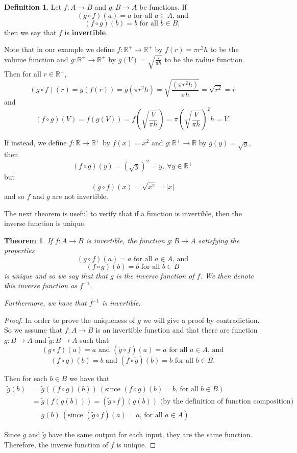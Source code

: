 \documentclass[
]{book}
\newtheorem{theorem}{Theorem}[chapter]
\theoremstyle{definition}
\newtheorem{definition}{Definition}[chapter]
\theoremstyle{definition}
\theoremstyle{definition}
\theoremstyle{definition}
\theoremstyle{remark}
\begin{document}
\begin{definition}
Let \(f:A \rightarrow B\) and \(g:B \rightarrow A\) be functions. If
\[(g\circ f) (a)=a \mbox{ for all } a\in A \mbox{, and}\]
\[(f\circ g) (b)=b \mbox{ for all }b\in B,\] then we say that \(f\) is \textbf{invertible}.
\end{definition}

Note that in our example we define \(f:\mathbb{R}^+\rightarrow \mathbb{R}^+\) by \(f(r)= \pi r^2 h\) to be the volume function and \(g:\mathbb{R}^+\rightarrow \mathbb{R}^+\) by \(g(V)=\sqrt{\frac{V}{\pi h}}\) to be the radius function. Then for all \(r\in \mathbb{R}^+\),
\[(g\circ f) (r) = g (f(r)) = g\left(\pi r^2 h\right) = \sqrt{ \frac{\left(\pi r^2 h\right)}{\pi h}} = \sqrt{r^2}=r\] and
\[(f \circ g) (V) = f(g(V)) = f\left(\sqrt{\frac{V}{\pi h}}\right) = \pi \left(\sqrt{\frac{V}{\pi h}}\right)^2 h = V.\]

If instead, we define \(f:\mathbb{R}\rightarrow \mathbb{R}^+\) by \(f(x)=x^2\) and \(g:\mathbb{R^+} \rightarrow \mathbb{R}\) by \(g(y)=\sqrt{y}\), then \[(f\circ g) (y) =\left(\sqrt{y}\right)^2 =y, \: \forall y\in \mathbb{R}^+\] but \[(g\circ f)(x) = \sqrt{x^2} = |x|\] and so \(f\) and \(g\) are not invertible.

The next theorem is useful to verify that if a function is invertible, then the inverse function is unique.

\begin{theorem}
\protect\hypertarget{thm:invertible}{}\label{thm:invertible}If \(f:A \rightarrow B\) is invertible, the function \(g:B\rightarrow A\) satisfying the properties
\[(g\circ f) (a)=a \mbox{ for all } a\in A \mbox{, and}\]
\[(f\circ g) (b)=b \mbox{ for all }b\in B\]
is unique and so we say that that \(g\) is the inverse function of \(f\). We then denote this inverse function as \(f^{-1}\).

Furthermore, we have that \(f^{-1}\) is invertible.
\end{theorem}

\begin{proof}
In order to prove the uniqueness of \(g\) we will give a proof by contradiction. So we assume that \(f:A\rightarrow B\) is an invertible function and that there are function \(g:B\rightarrow A\) and \(\tilde{g}:B\rightarrow A\) such that
\[(g\circ f) (a)=a \mbox{ and } (\tilde{g}\circ f)(a) = a \mbox{ for all } a \in A \mbox{, and}\]
\[(f\circ g)(b)=b \mbox{ and } (f\circ \tilde{g})(b)=b \mbox{ for all } b\in B.\]

Then for each \(b\in B\) we have that
\begin{align*}
\tilde{g}(b) &= \tilde{g}\left( (f\circ g)(b)\right) \: (\mbox{since } (f\circ g)(b)=b \mbox{, for all } b \in B) \\
&= \tilde{g}\left(f(g(b))\right) = (\tilde{g} \circ f)(g(b)) \mbox{ (by the definition of function composition)} \\
&= g(b) \: (\mbox{since } (\tilde{g}\circ f)(a)=a \mbox{, for all } a\in A).
\end{align*}

Since \(g\) and \(\tilde{g}\) have the same output for each input, they are the same function. Therefore, the inverse function of \(f\) is unique.
\end{proof}
\end{document}
